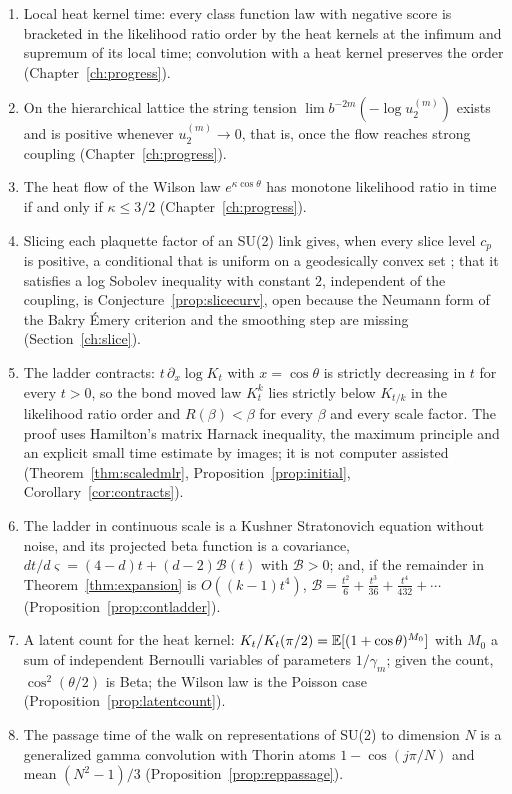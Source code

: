 \begin{enumerate}
\item Local heat kernel time: every class function law with negative score is bracketed in the likelihood ratio order by the heat kernels at the infimum and supremum of its local time; convolution with a heat kernel preserves the order (Chapter~\ref{ch:progress}).
\item On the hierarchical lattice the string tension $\lim b^{-2m}(-\log u_2^{(m)})$ exists and is positive whenever $u_2^{(m)}\to0$, that is, once the flow reaches strong coupling (Chapter~\ref{ch:progress}).
\item The heat flow of the Wilson law $e^{\kappa\cos\theta}$ has monotone likelihood ratio in time if and only if $\kappa\le3/2$ (Chapter~\ref{ch:progress}).
\item Slicing each plaquette factor of an SU(2) link gives, when every slice level $c_p$ is positive, a conditional that is uniform on a geodesically convex set ; that it satisfies a log Sobolev inequality with constant $2$, independent of the coupling, is Conjecture~\ref{prop:slicecurv}, open because the Neumann form of the Bakry \'Emery criterion and the smoothing step are missing (Section~\ref{ch:slice}).
\item The ladder contracts: $t\,\partial_x\log K_t$ with $x=\cos\theta$ is strictly decreasing in $t$ for every $t>0$, so the bond moved law $K_t^k$ lies strictly below $K_{t/k}$ in the likelihood ratio order and $R(\beta)<\beta$ for every $\beta$ and every scale factor. The proof uses Hamilton's matrix Harnack inequality, the maximum principle and an explicit small time estimate by images; it is not computer assisted (Theorem~\ref{thm:scaledmlr}, Proposition~\ref{prop:initial}, Corollary~\ref{cor:contracts}).
\item The ladder in continuous scale is a Kushner Stratonovich equation without noise, and its projected beta function is a covariance, $dt/d\varsigma=(4-d)t+(d-2)\mathcal B(t)$ with $\mathcal B>0$; and, if the remainder in Theorem~\ref{thm:expansion} is $O((k-1)t^4)$, $\mathcal B=\frac{t^2}6+\frac{t^3}{36}+\frac{t^4}{432}+\cdots$ (Proposition~\ref{prop:contladder}).
\item A latent count for the heat kernel: $K_t/K_t(\pi/2)=\mathbb{E}[(1+\cos\theta)^{M_0}]$ with $M_0$ a sum of independent Bernoulli variables of parameters $1/\gamma_m$; given the count, $\cos^2(\theta/2)$ is Beta; the Wilson law is the Poisson case (Proposition~\ref{prop:latentcount}).
\item The passage time of the walk on representations of SU(2) to dimension $N$ is a generalized gamma convolution with Thorin atoms $1-\cos(j\pi/N)$ and mean $(N^2-1)/3$ (Proposition~\ref{prop:reppassage}).

\end{enumerate}
